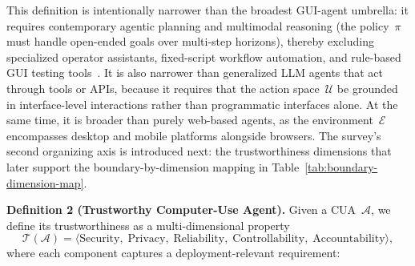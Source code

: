 This definition is intentionally narrower than the broadest GUI-agent umbrella: it requires contemporary agentic planning and multimodal reasoning (the policy~$\pi$ must handle open-ended goals over multi-step horizons), thereby excluding specialized operator assistants, fixed-script workflow automation, and rule-based GUI testing tools~\cite{sager2025acu}. It is also narrower than generalized LLM agents that act through tools or APIs, because it requires that the action space~$\mathcal{U}$ be grounded in interface-level interactions rather than programmatic interfaces alone. At the same time, it is broader than purely web-based agents, as the environment~$\mathcal{E}$ encompasses desktop and mobile platforms alongside browsers. The survey's second organizing axis is introduced next: the trustworthiness dimensions that later support the boundary-by-dimension mapping in Table~\ref{tab:boundary-dimension-map}.

\smallskip
\noindent\textbf{Definition 2 (Trustworthy Computer-Use Agent).}
Given a CUA~$\mathcal{A}$, we define its trustworthiness as a multi-dimensional property
\[
  \mathcal{T}(\mathcal{A}) = \langle \text{Security},\; \text{Privacy},\; \text{Reliability},\; \text{Controllability},\; \text{Accountability} \rangle,
\]
where each component captures a deployment-relevant requirement:

